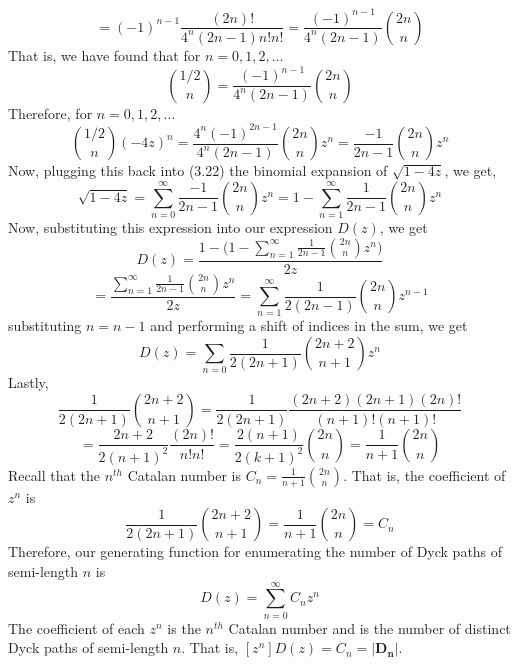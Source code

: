 \documentclass[12pt]{article}
\theoremstyle{definition}
\numberwithin{equation}{section}
\begin{document}
\begin{equation}
    =(-1)^{n-1}\frac{(2n)!}{4^n(2n-1)n!n!}= \frac{(-1)^{n-1}}{4^n(2n-1)}\binom{2n}{n}
\end{equation}
That is, we have found that for $n=0,1,2,\ldots$
\begin{equation}
    \binom{1/2}{n} =  \frac{(-1)^{n-1}}{4^{n}(2n-1)}\binom{2n}{n}
\end{equation}
Therefore, for $n=0,1,2,\ldots$
 \begin{equation}
     \binom{1/2}{n}(-4z)^n = \frac{4^n(-1)^{2n-1} }{4^n(2n-1)}\binom{2n}{n}z^n = \frac{-1}{2n-1}\binom{2n}{n}z^n
 \end{equation} %
 \smallskip
Now, plugging this back into (3.22) the binomial expansion of $\sqrt{1-4z}$, we get,
\begin{equation}
    \sqrt{1-4z} = \sum_{n=0}^\infty \frac{-1}{2n-1}\binom{2n}{n} z^n 
 = 1 - \sum_{n=1}^\infty \frac{1}{2n-1}\binom{2n}{n} z^n 
\end{equation}
Now, substituting this expression into our expression $D(z)$, we get
\begin{equation*}
    D(z) = \frac{1 - \Big( 1 - \sum_{n=1}^\infty \frac{1}{2n-1}\binom{2n}{n} z^n  \Big)}{2z} \end{equation*}
    \begin{equation} = \frac{ \sum_{n=1}^\infty \frac{1}{2n-1}\binom{2n}{n} z^n}{2z} = \sum_{n=1}^\infty \frac{1}{2(2n-1)}\binom{2n}{n} z^{n-1}
\end{equation}
substituting $n = n-1$ and performing a shift of indices in the sum, we get
\begin{equation}
    D(z) =  \sum_{n = 0}\frac{1}{2(2n+1)}\binom{2n+2}{n+1}z^{n}
\end{equation}
Lastly,
$$\frac{1}{2(2n+1)}\binom{2n+2}{n+1} = \frac{1}{2(2n+1)}\frac{(2n+2)(2n+1)(2n)!}{(n+1)!(n+1)!}$$
\begin{equation} = \frac{2n+2}{2(n+1)^2} \frac{(2n)!}{n!n!} = \frac{2(n+1)}{2(k+1)^2} \binom{2n}{n} = \frac{1}{n+1}\binom{2n}{n}\end{equation}
Recall that the $n^{th}$ Catalan number is $C_n= \frac{1}{n+1}\binom{2n}{n}$. That is, the coefficient of $z^n$ is
\begin{equation}
    \frac{1}{2(2n+1)}\binom{2n+2}{n+1} = \frac{1}{n+1}\binom{2n}{n} = C_n 
\end{equation}
Therefore, our generating function for enumerating the number of Dyck paths of semi-length $n$ is
\begin{equation}
    D(z) = \sum_{n=0}^\infty C_nz^n
\end{equation}
The coefficient of each $z^n$ is the $n^{th}$ Catalan number and is the number of distinct Dyck paths of semi-length $n$. That is, $[z^n]D(z) = C_n = |\mathbf{D_n}|$.\smallskip
\end{document}
